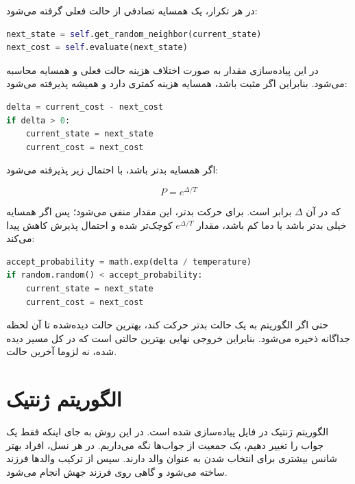 \documentclass[10.5pt]{exam}
\begin{document}
در هر تکرار، یک همسایه تصادفی از حالت فعلی گرفته می‌شود:

\begin{latin}
\begin{lstlisting}[language=Python]
next_state = self.get_random_neighbor(current_state)
next_cost = self.evaluate(next_state)
\end{lstlisting}
\end{latin}

در این پیاده‌سازی مقدار
به صورت اختلاف هزینه حالت فعلی و همسایه محاسبه می‌شود. بنابراین اگر
مثبت باشد، همسایه هزینه کمتری دارد و همیشه پذیرفته می‌شود:

\begin{latin}
\begin{lstlisting}[language=Python]
delta = current_cost - next_cost
if delta > 0:
    current_state = next_state
    current_cost = next_cost
\end{lstlisting}
\end{latin}

اگر همسایه بدتر باشد، با احتمال زیر پذیرفته می‌شود:

\[
    P = e^{\Delta / T}
\]

که در آن
\(\Delta\)
برابر
است. برای حرکت بدتر، این مقدار منفی می‌شود؛ پس اگر همسایه خیلی بدتر باشد یا دما کم باشد، مقدار
\(e^{\Delta/T}\)
کوچک‌تر شده و احتمال پذیرش کاهش پیدا می‌کند:

\begin{latin}
\begin{lstlisting}[language=Python]
accept_probability = math.exp(delta / temperature)
if random.random() < accept_probability:
    current_state = next_state
    current_cost = next_cost
\end{lstlisting}
\end{latin}

حتی اگر الگوریتم به یک حالت بدتر حرکت کند، بهترین حالت دیده‌شده تا آن لحظه جداگانه ذخیره می‌شود. بنابراین خروجی نهایی بهترین حالتی است که در کل مسیر دیده شده، نه لزوما آخرین حالت.

\section{الگوریتم ژنتیک}
الگوریتم ژنتیک در فایل
پیاده‌سازی شده است. در این روش به جای اینکه فقط یک جواب را تغییر دهیم، یک جمعیت از جواب‌ها نگه می‌داریم. در هر نسل، افراد بهتر شانس بیشتری برای انتخاب شدن به عنوان والد دارند. سپس از ترکیب والدها فرزند ساخته می‌شود و گاهی روی فرزند جهش انجام می‌شود.
\end{document}
